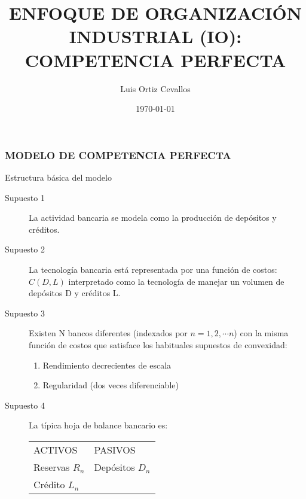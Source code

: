 \documentclass[10pt, xcolor=table, x11names]{beamer}
\title[]{ENFOQUE DE ORGANIZACIÓN INDUSTRIAL (IO): COMPETENCIA PERFECTA}
\author[Luis Ortiz]{Luis Ortiz Cevallos}
\institute[SECMCA]{\bf SECMCA}
\date[\today]{\footnotesize \today}
\begin{document}
\begin{frame}
\titlepage
\end{frame}


\begin{frame}
    \frametitle{{\normalsize MODELO DE COMPETENCIA PERFECTA} {}}
    
    \begin{block} {Estructura básica del modelo}
        \begin{description}
            \item[Supuesto 1]  La actividad bancaria se modela como la producción de depósitos y créditos.
            \item[Supuesto 2] La tecnología bancaria está representada por una función de costos: $C(D,L)$ interpretado como la tecnología de manejar un volumen de depósitos D y créditos L.
            \item[Supuesto 3] Existen N bancos diferentes (indexados por $n=1, 2, \cdots n$) con la misma función de costos que satisface los habituales supuestos de convexidad:
            \begin{enumerate}
                \item Rendimiento decrecientes de escala 
                \item Regularidad (dos veces diferenciable)
            \end{enumerate}
            \item[Supuesto 4] La típica hoja de balance bancario es:
           \begin{table}[htbp]
            \centering
             \begin{tabular}{ll}
                ACTIVOS & PASIVOS \\
                Reservas $R_{n}$ & Depósitos $D_{n}$ \\
                Crédito  $L_{n}$ &  \\
            \end{tabular}%
            \end{table}%
            
                 
        \end{description}
        
    \end{block}	
    
\end{frame}
\end{document}
